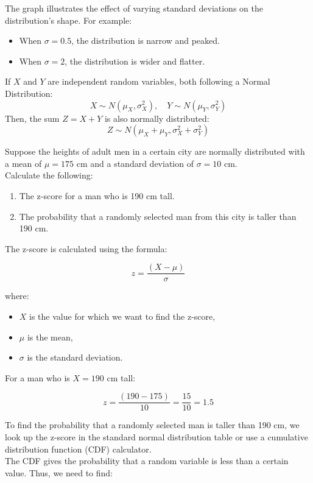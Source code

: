 The graph illustrates the effect of varying standard deviations on the distribution's shape. For example:
\begin{itemize}
    \item When $\sigma = 0.5$, the distribution is narrow and peaked.
    \item When $\sigma = 2$, the distribution is wider and flatter.
\end{itemize} 

If \(X\) and \(Y\) are independent random variables, both following a Normal Distribution:
\[
X \sim N(\mu_X, \sigma_X^2), \quad Y \sim N(\mu_Y, \sigma_Y^2)
\]
Then, the sum \(Z = X + Y\) is also normally distributed:
\[
Z \sim N(\mu_X + \mu_Y, \sigma_X^2 + \sigma_Y^2)
\]

\begin{example}
    Suppose the heights of adult men in a certain city are normally distributed with a mean of \(\mu = 175\) cm and a standard deviation of \(\sigma = 10\) cm. \\

Calculate the following:
\begin{enumerate}
    \item The z-score for a man who is 190 cm tall.
    \item The probability that a randomly selected man from this city is taller than 190 cm.
\end{enumerate}

The z-score is calculated using the formula:

\[
z = \frac{(X - \mu)}{\sigma}
\]

where:
\begin{itemize}
    \item \(X\) is the value for which we want to find the z-score,
    \item \(\mu\) is the mean,
    \item \(\sigma\) is the standard deviation.
\end{itemize}

For a man who is \(X = 190\) cm tall:

\[
z = \frac{(190 - 175)}{10} = \frac{15}{10} = 1.5
\]

To find the probability that a randomly selected man is taller than 190 cm, we look up the z-score in the standard normal distribution table or use a cumulative distribution function (CDF) calculator. \\

The CDF gives the probability that a random variable is less than a certain value. Thus, we need to find:


\end{example}
